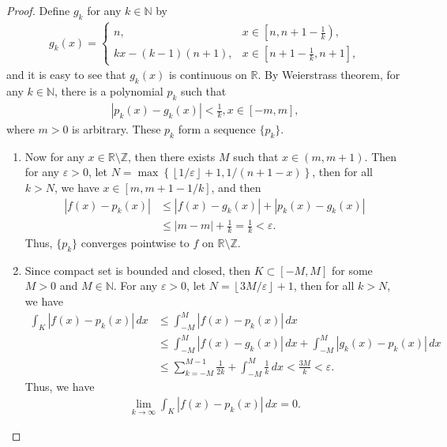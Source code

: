 \documentclass[11pt]{article}
\theoremstyle{definition}
\numberwithin{equation}{subsection}
\begin{document}
\begin{proof}
Define $g_k$ for any $k \in \mathbb{N}$ by
\begin{align*}
    g_k(x) = \begin{cases}
        n, & \displaystyle  x \in \left[n, n+1-\frac{1}{k}\right), \\
        kx - (k-1)(n+1), & \displaystyle  x \in \left[n+1-\frac{1}{k}, n+1\right],
    \end{cases}
\end{align*}
and it is easy to see that $g_k(x)$ is continuous on $\mathbb{R}$. By Weierstrass theorem, for any $k \in \mathbb{N}$, there is a polynomial $p_k$ such that 
\begin{align*}
    \left| p_k(x) - g_k(x) \right| < \frac{1}{k}, x \in [-m, m],
\end{align*}
where $m > 0$ is arbitrary. These $p_k$ form a sequence $\{p_k\}$. 
\begin{enumerate}[label=(\alph*)]
    \item Now for any $x \in \mathbb{R}\setminus \mathbb{Z}$, then there exists $M$ such that $x \in (m, m+1)$. Then for any $\varepsilon > 0$, let $N = \max\left\{\left\lfloor 1/\varepsilon \right\rfloor + 1, 1/(n + 1 - x) \right\}$, then for all $k > N$, we have $x \in [m, m + 1 - 1/k]$, and then
    \begin{align*}
        \left| f(x) - p_k(x) \right| & \leq \left| f(x) - g_k(x) \right| + \left| p_k(x) - g_k(x) \right| \\
        & \leq |m - m| + \frac{1}{k} = \frac{1}{k} < \varepsilon.
    \end{align*}
    Thus, $\{p_k\}$ converges pointwise to $f$ on $\mathbb{R}\setminus \mathbb{Z}$. 
    
    \item Since compact set is bounded and closed, then $K \subset [-M, M]$ for some $M > 0$ and $M \in \mathbb{N}$. For any $\varepsilon > 0$, let $N = \left\lfloor 3M/\varepsilon \right\rfloor + 1$, then for all $k > N$, we have
    \begin{align*}
        \int_K \left| f(x) - p_k(x) \right|\, dx & \leq \int^{M}_{-M} \left| f(x) - p_k(x) \right|\, dx \\
        & \leq \int^{M}_{-M} \left| f(x) - g_k(x) \right|\, dx + \int^{M}_{-M} \left| g_k(x) - p_k(x) \right|\, dx \\
        & \leq \sum^{M-1}_{k=-M} \frac{1}{2k} + \int^{M}_{-M} \frac{1}{k} \, dx < \frac{3M}{k} < \varepsilon.
    \end{align*}
    Thus, we have
    \begin{align*}
        \lim_{k\to\infty} \int_K \left| f(x) - p_k(x) \right|\, dx = 0.
    \end{align*}
\end{enumerate}
\end{proof}
\end{document}
